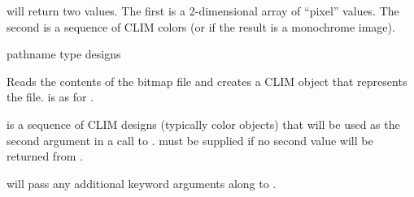  will return two values.  The first is a 2-dimensional
array of ``pixel'' values.  The second is a sequence of CLIM colors (or 
if the result is a monochrome image).


 {pathname \key type designs \allow}

Reads the contents of the bitmap file  and creates a CLIM
 object that represents the file.   is as for
.

 is a sequence of CLIM designs (typically color objects) that will
be used as the second argument in a call to .  
must be supplied if no second value will be returned from .

 will pass any additional keyword arguments
along to .
